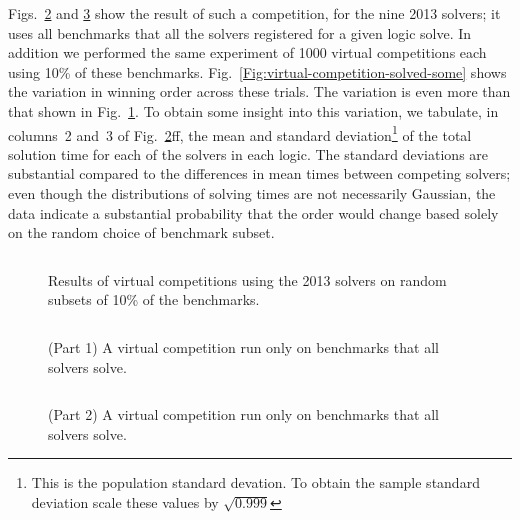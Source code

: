 \documentclass[smallcondensed]{svjour3}
\begin{document}
Figs.~\ref{Fig:virtual-competition-solved} and \ref{Fig:virtual-competition-solved2} show the result of such a competition, for the nine 2013 solvers; it uses all benchmarks that all the solvers registered for a given logic solve. In addition we performed the same experiment of 1000 virtual competitions each using 10\% of these benchmarks.  Fig.~\ref{Fig:virtual-competition-solved-some} shows the variation in winning order across these trials. The variation is even more than that shown in Fig.~\ref{Fig:virtual-competition-some}. To obtain some insight into this variation, we tabulate, in columns~2 and~3 of Fig.~\ref{Fig:virtual-competition-solved}ff, the mean and standard deviation\footnote{This is the population standard devation. To obtain the sample standard deviation scale these values by $\sqrt{0.999}$ } of the total solution time for each of the solvers in each logic. The standard deviations are substantial compared to the differences in mean times between competing solvers; even though the distributions of solving times are not necessarily Gaussian, the data indicate a substantial probability that the order would change based solely on the random choice of benchmark subset.

\begin{figure}
\centering
\begin{tabular}{|lrr|rr|r|}
\hline

\end{tabular}
\caption{Results of virtual competitions using the 2013 solvers on random subsets of 10\% of the benchmarks.}
\label{Fig:virtual-competition-some}
\end{figure}

\begin{figure}
\centering
\begin{tabular}{|p{.01in}rrrl|}
\hline

\end{tabular}
\caption{(Part 1) A virtual competition run only on benchmarks that all solvers solve.}
\label{Fig:virtual-competition-solved}
\end{figure}

\begin{figure}
\centering
\begin{tabular}{|p{.01in}rrrl|}
\hline

\end{tabular}
\caption{(Part 2) A virtual competition run only on benchmarks that all solvers solve.}
\label{Fig:virtual-competition-solved2}
\end{figure}
\end{document}
